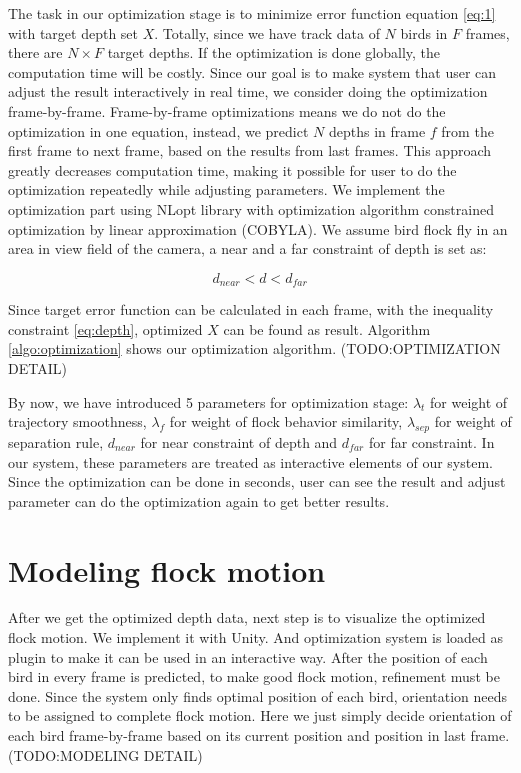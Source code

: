 The task in our optimization stage is to minimize error function equation \ref{eq:1} with target depth set $X$. Totally, since we have track data of $N$ birds in $F$ frames, there are $N{\times}F$ target depths. If the optimization is done globally, the computation time will be costly. Since our goal is to make system that user can adjust the result interactively in real time, we consider doing the optimization frame-by-frame.
Frame-by-frame optimizations means we do not do the optimization in one equation, instead, we predict $N$ depths in frame $f$ from the first frame to next frame, based on the results from last frames. This approach greatly decreases computation time, making it possible for user to do the optimization repeatedly while adjusting parameters.
We implement the optimization part using NLopt library \cite{NLopt} with optimization algorithm constrained optimization by linear approximation (COBYLA)\cite{COBYLA}. We assume bird flock fly in an area in view field of the camera, a near and a far constraint of depth is set as:


\begin{equation}\label{eq:depth}
d_{near} < d < d_{far}
\end{equation}

Since target error function can be calculated in each frame, with the inequality constraint \ref{eq:depth}, optimized $X$ can be found as result.  Algorithm \ref{algo:optimization}  shows our optimization algorithm.
(TODO:OPTIMIZATION DETAIL)


By now, we have introduced 5 parameters for optimization stage: $\lambda_{t}$ for weight of trajectory smoothness, $\lambda_{f}$ for weight of flock behavior similarity, $\lambda_{sep}$ for weight of separation rule, $d_{near}$ for near constraint of depth and $d_{far}$ for far constraint. In our system, these parameters are treated as interactive elements of our system. Since the optimization can be done in seconds, user can see the result and adjust parameter can do the optimization again to get better results. 


\section{Modeling flock motion}


After we get the optimized depth data, next step is to visualize the optimized flock motion. We implement it with Unity\cite{Unity}. And optimization system is loaded as plugin to make it can be used in an interactive way.
After the position of each bird in every frame is predicted, to make good flock motion, refinement must be done. Since the system only finds optimal position of each bird, orientation needs to be assigned to complete flock motion. Here we just simply decide orientation of each bird frame-by-frame based on its current position and position in last frame.
(TODO:MODELING DETAIL)

